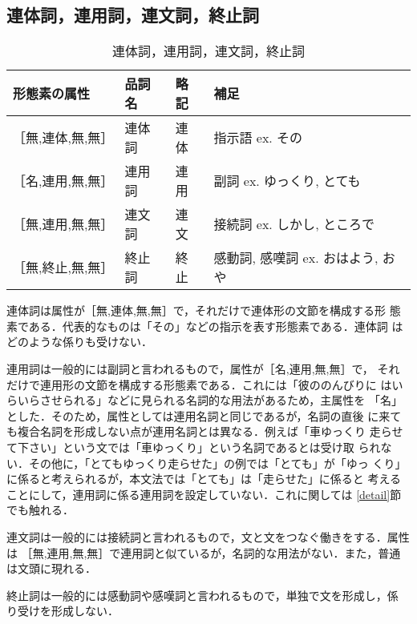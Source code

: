 \subsection{連体詞，連用詞，連文詞，終止詞}
\begin{table*}
\begin{center}
\begin{tabular}{|l|l|l|l|}
\hline
形態素の属性 & 品詞名 & 略記 & 補足 \\
\hline
［無,連体,無,無］ & 連体詞 & 連体 & 指示語 ex. その \\
［名,連用,無,無］ & 連用詞 & 連用 & 副詞 ex. ゆっくり, とても \\
［無,連用,無,無］ & 連文詞 & 連文 & 接続詞 ex. しかし, ところで \\
［無,終止,無,無］ & 終止詞 & 終止 & 感動詞, 感嘆詞 ex. おはよう, おや \\
\hline
\end{tabular}
\end{center}
\caption{連体詞，連用詞，連文詞，終止詞}
\label{rentaisi-list}
\end{table*}

連体詞は属性が［無,連体,無,無］で，それだけで連体形の文節を構成する形
態素である．代表的なものは「その」などの指示を表す形態素である．連体詞
はどのような係りも受けない．

連用詞は一般的には副詞と言われるもので，属性が［名,連用,無,無］で，
それだけで連用形の文節を構成する形態素である．これには「彼ののんびりに
はいらいらさせられる」などに見られる名詞的な用法があるため，主属性を
「名」とした．そのため，属性としては連用名詞と同じであるが，名詞の直後
に来ても複合名詞を形成しない点が連用名詞とは異なる．例えば「車ゆっくり
走らせて下さい」という文では「車ゆっくり」という名詞であるとは受け取
られない．その他に，「とてもゆっくり走らせた」の例では「とても」が「ゆっ
くり」に係ると考えられるが，本文法では「とても」は「走らせた」に係ると
考えることにして，連用詞に係る連用詞を設定していない．これに関しては
\ref{detail}節でも触れる．

連文詞は一般的には接続詞と言われるもので，文と文をつなぐ働きをする．属性は
［無,連用,無,無］で連用詞と似ているが，名詞的な用法がない．また，普通
は文頭に現れる．

終止詞は一般的には感動詞や感嘆詞と言われるもので，単独で文を形成し，係
り受けを形成しない．

